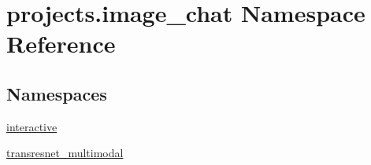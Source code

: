 \hypertarget{namespaceprojects_1_1image__chat}{}\section{projects.\+image\+\_\+chat Namespace Reference}
\label{namespaceprojects_1_1image__chat}
\subsection*{Namespaces}
\begin{DoxyCompactItemize}
\item 
 \hyperlink{namespaceprojects_1_1image__chat_1_1interactive}{interactive}
\item 
 \hyperlink{namespaceprojects_1_1image__chat_1_1transresnet__multimodal}{transresnet\+\_\+multimodal}
\end{DoxyCompactItemize}
